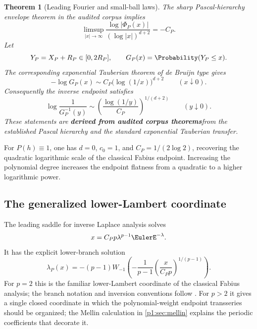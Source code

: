 \documentclass[11pt,oneside]{article}
\numberwithin{equation}{section}
\newtheorem{theorem}{Theorem}[section]
\theoremstyle{definition}
\theoremstyle{remark}
\newcommand{\statusderived}{\textcolor{linkblue}{\textbf{derived from audited corpus theorems}}}
\begin{document}
\begin{theorem}[Leading Fourier and small-ball laws]
\label{p1:thm:leading-laws}
The sharp Pascal-hierarchy envelope theorem in the audited corpus implies
\begin{equation}
 \limsup_{|x|\to\infty}
 \frac{\log|\Phi_P(x)|}{(\log|x|)^{d+2}}
 =-C_P.
 \label{p1:eq:fourier-leading-P}
\end{equation}
Let
\[
 Y_P=X_P+R_P\in[0,2R_P],
 \qquad
 G_P(x)=\Probability(Y_P\le x).
\]
The corresponding exponential Tauberian theorem of de Bruijn type
\cite{p1:debruijn1959,p1:voss2009} gives
\begin{equation}
 -\log G_P(x)
 \sim C_P\bigl(\log(1/x)\bigr)^{d+2}
 \qquad(x\downarrow0).
 \label{p1:eq:smallball-leading-P}
\end{equation}
Consequently the inverse endpoint satisfies
\begin{equation}
 \boxed{
 \log\frac1{G_P^{-1}(y)}
 \sim
 \left(\frac{\log(1/y)}{C_P}\right)^{1/(d+2)}
 \qquad(y\downarrow0).}
 \label{p1:eq:inverse-leading-P}
\end{equation}
These statements are \statusderived from the established Pascal hierarchy and the standard
exponential Tauberian transfer.
\end{theorem}

\begin{remark}
For $P(h)\equiv1$, one has $d=0$, $c_0=1$, and
$C_P=1/(2\log2)$, recovering the quadratic logarithmic scale of the classical Fabius
endpoint.  Increasing the polynomial degree increases the endpoint flatness from a quadratic
to a higher logarithmic power.
\end{remark}

\subsection{The generalized lower-Lambert coordinate}

The leading saddle for inverse Laplace analysis solves
\begin{equation}
 x=C_Pp\lambda^{p-1}\EulerE^{-\lambda}.
 \label{p1:eq:generalized-saddle-equation}
\end{equation}
It has the explicit lower-branch solution
\begin{equation}
 \boxed{
 \lambda_P(x)
 =-(p-1)W_{-1}\!\left(
   -\frac1{p-1}
   \left(\frac{x}{C_Pp}\right)^{1/(p-1)}
 \right).}
 \label{p1:eq:generalized-lambert}
\end{equation}
For $p=2$ this is the familiar lower-Lambert coordinate of the classical Fabius analysis;
the branch notation and inversion conventions follow \cite{p1:corless1996}.
For $p>2$ it gives a single closed coordinate in which the polynomial-weight endpoint
transseries should be organized; the Mellin calculation in \cref{p1:sec:mellin} explains the
periodic coefficients that decorate it.
\end{document}
